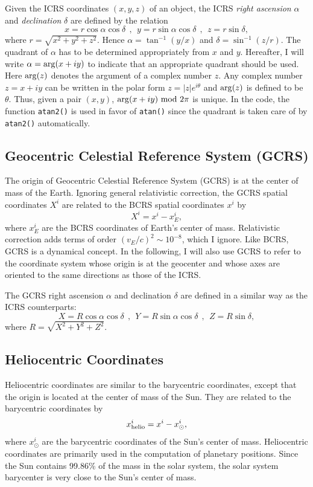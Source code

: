 \documentclass[12pt]{article}
\newcommand \beq {\begin{equation}}
\newcommand \eeq {\end{equation}}
\begin{document}
Given the ICRS coordinates $(x,y,z)$ of an object, the ICRS {\em right ascension} 
$\alpha$ and {\em declination} $\delta$ are defined by the relation 
\beq
  x = r \cos \alpha \cos \delta \ \ , \ \ 
  y = r \sin \alpha \cos \delta \ \ , \ \
  z = r \sin \delta ,
\eeq
where $r=\sqrt{x^2+y^2+z^2}$. Hence $\alpha = \tan^{-1} (y/x)$ and 
$\delta = \sin^{-1}(z/r)$. The quadrant of $\alpha$ has to be determined
appropriately from $x$ and $y$. Hereafter, I will write $\alpha = {\rm arg}(x+iy)$ 
to indicate that an appropriate quadrant should be used. Here ${\rm arg}(z)$ denotes 
the argument of a complex number $z$. Any complex number $z=x+iy$ can be written in 
the polar form $z=|z| e^{i\theta}$ and ${\rm arg}(z)$ is defined to be $\theta$. 
Thus, given a pair $(x,y)$, ${\rm arg}(x+iy)~{\rm mod}~2\pi$ is unique.
In the code, the function {\tt atan2()} is used in favor of {\tt atan()} 
since the quadrant is taken care of by {\tt atan2()} automatically.

\subsection{Geocentric Celestial Reference System (GCRS)}

The origin of Geocentric Celestial Reference System (GCRS) is at the 
center of mass of the Earth. 
Ignoring general relativistic correction, the GCRS spatial coordinates $X^i$ 
are related to the BCRS spatial coordinates $x^i$ by 
\beq
  X^i = x^i - x^i_E ,
\label{eq:GCRSX}
\eeq
where $x^i_E$ are the BCRS coordinates of Earth's center of mass. Relativistic 
correction adds terms of order $(v_E/c)^2 \sim 10^{-8}$, which I ignore. Like 
BCRS, GCRS is a dynamical concept. In the following, I will also use GCRS 
to refer to the coordinate system whose origin is at the geocenter and whose 
axes are oriented to the same directions as those of the ICRS.

The GCRS right ascension $\alpha$ and declination $\delta$ are defined in a
similar way as the ICRS counterparts:
\beq
  X = R \cos \alpha \cos \delta \ \ , \ \
  Y = R \sin \alpha \cos \delta \ \ , \ \
  Z = R \sin \delta ,
\label{eq:GCRScoord}
\eeq
where $R=\sqrt{X^2+Y^2+Z^2}$.

\subsection{Heliocentric Coordinates} 

Heliocentric coordinates are similar to the barycentric coordinates, 
except that the origin is located at the center of mass of the Sun. 
They are related to the barycentric coordinates by 
\beq
 x^i_{\rm helio} = x^i - x^i_{\odot} ,
\eeq
where $x^i_{\odot}$ are the barycentric coordinates of the Sun's center 
of mass. Heliocentric coordinates are primarily used in the computation 
of planetary positions. Since the Sun contains 99.86\% of the mass 
in the solar system, the solar system barycenter is very close to the 
Sun's center of mass.
\end{document}
